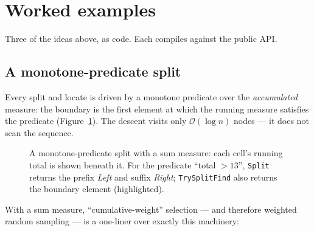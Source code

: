 \documentclass[11pt]{article}
\newcommand{\cs}[1]{\lstinline|#1|}
\newcommand{\bigO}{\ensuremath{\mathcal{O}}}
\begin{document}
\clearpage
\section{Worked examples}
\label{sec:examples}

Three of the ideas above, as code. Each compiles against the public API.

\subsection{A monotone-predicate split}

Every split and locate is driven by a monotone predicate over the \emph{accumulated} measure: the boundary
is the first element at which the running measure satisfies the predicate (Figure~\ref{fig:split}). The
descent visits only $\bigO(\log n)$ nodes --- it does not scan the sequence.

\begin{figure}[ht]
\centering
{}
\caption{A monotone-predicate split with a sum measure: each cell's running total is shown beneath it. For
the predicate ``total $> 13$'', \cs{Split} returns the prefix \emph{Left} and suffix \emph{Right};
\cs{TrySplitFind} also returns the boundary element (highlighted).}
\label{fig:split}
\end{figure}

With a sum measure, ``cumulative-weight'' selection --- and therefore weighted random sampling --- is a
one-liner over exactly this machinery:
\end{document}
